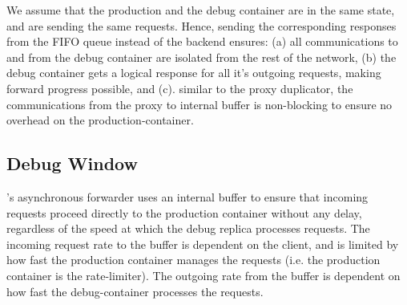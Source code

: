 We assume that the production and the debug container are in the same state, and are sending the same requests. 
Hence, sending the corresponding responses from the FIFO queue instead of the backend ensures:
(a) all communications to and from the debug container are isolated from the rest of the network,
(b) the debug container gets a logical response for all it's outgoing requests, making forward progress possible,
and (c). similar to the proxy duplicator, the communications from the proxy to internal buffer is non-blocking to ensure no overhead on the production-container.



\subsection{Debug Window}
\label{sec:parikshanWindow}

\parikshan's asynchronous forwarder uses an internal buffer to ensure that incoming requests proceed directly to the production container without any delay, regardless of the speed at which the debug replica processes requests.
The incoming request rate to the buffer is dependent on the client, and is limited by how fast the production container manages the requests (i.e. the production container is the rate-limiter).
The outgoing rate from the buffer is dependent on how fast the debug-container processes the requests.



